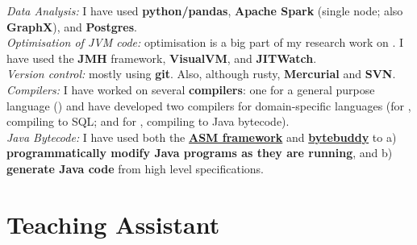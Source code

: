 \documentclass[10pt]{article} %
\begin{document}

 {

  \textit{Data Analysis:} I have used \textbf{python/pandas},
  \textbf{Apache Spark} (single node; also \textbf{GraphX}), and \textbf{Postgres}.\\[1mm]
  \textit{Optimisation of JVM code:} optimisation is a big part of my research work on
  \cflat{}. I have used the \textbf{JMH} framework, \textbf{VisualVM}, and \textbf{JITWatch}.\\[1mm]
  \textit{Version control:} mostly using \textbf{git}. Also, although rusty,
  \textbf{Mercurial} and \textbf{SVN}.\\[1mm]
  \textit{Compilers:} I have worked on several \textbf{compilers}: one for a
  general purpose language (\encore{}) and have developed two compilers for
  domain-specific languages (for \spencer{}, compiling to SQL; and for \cflat{},
  compiling to
  Java bytecode).\\[1mm]
  \textit{Java Bytecode:} I have used both the \textbf{\href{foo}{ASM
      framework}} and \textbf{\href{https://bytebuddy.net}{bytebuddy}} to a)
  \textbf{programmatically modify Java programs as they are running}, and b)
  \textbf{generate Java code} from high level specifications.}

\section{Teaching Assistant}
\end{document}
